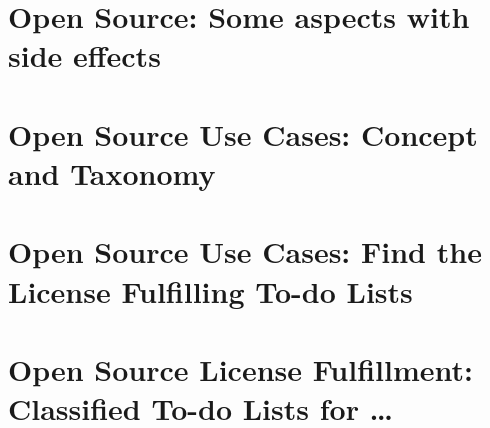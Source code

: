 \documentclass[DIV=calc,BCOR=5mm,12pt,headings=small,oneside,toc=bib]{scrbook}
\begin{document}
\chapter{Open Source: Some aspects with side effects}







\chapter{Open Source Use Cases: Concept and Taxonomy}




\chapter{Open Source Use Cases: Find the License Fulfilling To-do Lists}



\chapter{Open Source License Fulfillment: Classified To-do Lists for \ldots}














\end{document}
